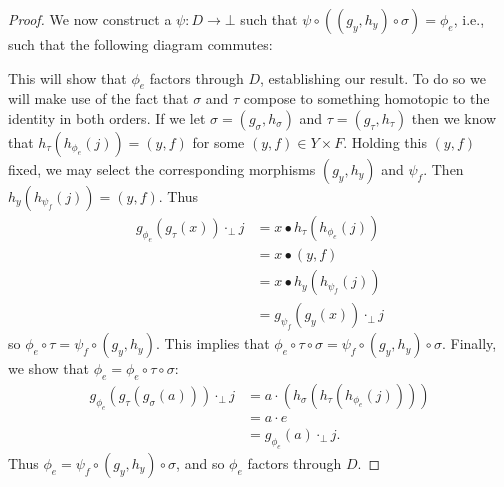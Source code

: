 \documentclass{article}
\begin{document}
\begin{proof}
We now construct a $\psi : D \to \bot$ such that $\psi \circ ((g_y, h_y) \circ \sigma) = \phi_e$, i.e., such that the following diagram commutes:
\begin{center}
\end{center}
This will show that $\phi_e$ factors through $D$, establishing our result.
To do so we will make use of the fact that $\sigma$ and $\tau$ compose to something homotopic to the identity in both orders.
If we let $\sigma = (g_\sigma, h_\sigma )$ and $\tau = (g_\tau, h_\tau )$ then we know that $h_\tau (h_{\phi_e} (j)) = (y, f)$ for some $(y, f) \in Y \times F$.
Holding this $(y, f)$ fixed, we may select the corresponding morphisms $(g_y, h_y)$ and $\psi_f$.
Then $h_y (h_{\psi_f} (j)) = (y, f)$.
Thus
\[
\begin{split}
  g_{\phi_e}(g_\tau(x)) \cdot_\bot j & = x \bullet h_\tau(h_{\phi_e}(j)) \\
                                     & = x \bullet (y, f) \\
                                     & = x \bullet h_y(h_{\psi_f}(j)) \\
                                     & = g_{\psi_f}(g_y(x)) \cdot_\bot j
\end{split}
\]
so $\phi_e \circ \tau = \psi_f \circ (g_y, h_y)$. This implies that $\phi_e \circ \tau \circ \sigma = \psi_f \circ (g_y, h_y) \circ \sigma$.
Finally, we show that $\phi_e = \phi_e \circ \tau \circ \sigma$:
\[
\begin{split}
  g_{\phi_e} (g_{\tau} (g_{\sigma} (a))) \cdot_\bot j & = a \cdot (h_{\sigma} (h_\tau (h_{\phi_e} (j)))) \\
                                                     & = a \cdot e \\
                                                     & = g_{\phi_e}(a) \cdot_\bot j. 
\end{split}
\]
Thus $\phi_e  = \psi_f \circ (g_y, h_y) \circ \sigma$, and so $\phi_e$ factors through $D$.
\end{proof}


\end{document}
